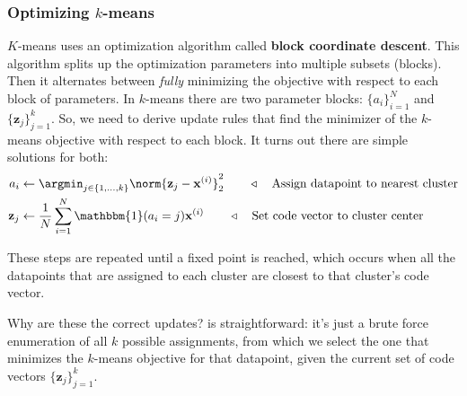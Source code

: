 \subsubsection{Optimizing $k$-means} $K$-means uses an optimization algorithm called \textbf{block coordinate descent}. This algorithm splits up the optimization parameters into multiple subsets (blocks). Then it alternates between \textit{fully} minimizing the objective with respect to each block of parameters. In $k$-means there are two parameter blocks: $\{a_i\}_{i=1}^N$ and $\{\mathbf{z}_j\}_{j=1}^k$. So, we need to derive update rules that find the minimizer of the $k$-means objective with respect to each block. It turns out there are simple solutions for both:
\begin{align}
    a_i &\leftarrow \argmin_{j \in \{1,\ldots,k\}} \norm{\mathbf{z}_j - \mathbf{x}^{(i)}}_2^2 \quad\quad \triangleleft\quad\text{Assign datapoint to nearest cluster}\label{eqn:representation_learning:kmeans_update_assignments}\\
    \mathbf{z}_j &\leftarrow \frac{1}{N}\sum_{i=1}^N \mathbbm{1}(a_i = j)\mathbf{x}^{(i)} \quad\quad \triangleleft\quad\text{Set code vector to cluster center}\label{eqn:representation_learning:kmeans_update_means}
\end{align}

These steps are repeated until a fixed point is reached, which occurs when all the datapoints that are assigned to each cluster are closest to that cluster's code vector.

Why are these the correct updates? \Eqn{\ref{eqn:representation_learning:kmeans_update_assignments}} is straightforward: it's just a brute force enumeration of all $k$ possible assignments, from which we select the one that minimizes the $k$-means objective for that datapoint, given the current set of code vectors $\{\mathbf{z}_j\}_{j=1}^k$.

